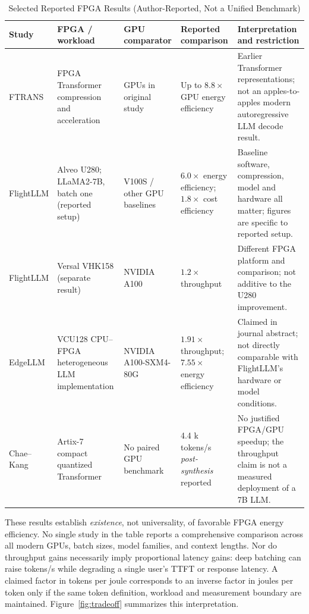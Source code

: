\documentclass[conference,10pt]{IEEEtran}
\begin{document}
\begin{table}[t]
\caption{Selected Reported FPGA Results (Author-Reported, Not a Unified Benchmark)}
\label{tab:results}
\centering
\footnotesize
\begin{tabular}{@{}p{1.65cm}p{2.45cm}p{2.45cm}p{3.0cm}p{5.2cm}@{}}
\toprule
Study & FPGA / workload & GPU comparator & Reported comparison & Interpretation and restriction \\
\midrule
FTRANS \cite{li2020} & FPGA Transformer compression and acceleration & GPUs in original study & Up to $8.8\times$ GPU energy efficiency & Earlier Transformer representations; not an apples-to-apples modern autoregressive LLM decode result. \\
FlightLLM \cite{zeng2024} & Alveo U280; LLaMA2-7B, batch one (reported setup) & V100S / other GPU baselines & $6.0\times$ energy efficiency; $1.8\times$ cost efficiency & Baseline software, compression, model and hardware all matter; figures are specific to reported setup. \\
FlightLLM \cite{zeng2024} & Versal VHK158 (separate result) & NVIDIA A100 & $1.2\times$ throughput & Different FPGA platform and comparison; not additive to the U280 improvement. \\
EdgeLLM \cite{huang2025} & VCU128 CPU--FPGA heterogeneous LLM implementation & NVIDIA A100-SXM4-80G & $1.91\times$ throughput; $7.55\times$ energy efficiency & Claimed in journal abstract; not directly comparable with FlightLLM's hardware or model conditions. \\
Chae--Kang \cite{chae2025} & Artix-7 compact quantized Transformer & No paired GPU benchmark & 4.4 k tokens/s \emph{post-synthesis} reported & No justified FPGA/GPU speedup; the throughput claim is not a measured deployment of a 7B LLM. \\
\bottomrule
\end{tabular}
\end{table}

These results establish \emph{existence}, not universality, of favorable FPGA energy efficiency. No single study in the table reports a comprehensive comparison across all modern GPUs, batch sizes, model families, and context lengths. Nor do throughput gains necessarily imply proportional latency gains: deep batching can raise tokens/s while degrading a single user's TTFT or response latency. A claimed factor in tokens per joule corresponds to an inverse factor in joules per token only if the same token definition, workload and measurement boundary are maintained. Figure~\ref{fig:tradeoff} summarizes this interpretation.
\end{document}
